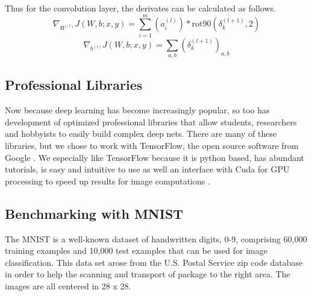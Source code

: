\documentclass[12pt, twocolumn]{article}
\begin{document}
Thus for the convolution layer, the derivates can be calculated as follows.
\begin{equation}
\nabla_{W^{(l)}}J(W,b;x,y) = \sum_{i=1}^m (a^{(l)}_i) \ast \textrm{rot90}( \delta^{(l+1)}_k,2)
\end{equation}
\begin{equation}
\nabla_{b^{(l)}}J(W,b;x,y)= \sum_{a,b}(\delta^{(l+1)}_k)_{a,b}
\end{equation}


\subsection{Professional Libraries}

Now because deep learning has become increasingly popular, so too has development of optimized professional libraries that allow students, researchers and hobbyists to easily build complex deep nets. There are many of these libraries, but we chose to work with TensorFlow, the open source software from Google \cite{TensorFlowGH}. We especially like TensorFlow because it is python based, has abundant tutorials, is easy and intuitive to use as well an interface with Cuda for GPU processing to speed up results for image computations \cite{TensorFlowWeb}. 









\subsection{Benchmarking with MNIST}


The MNIST is a well-known dataset of handwritten digits, 0-9, comprising 60,000 training examples and 10,000 test examples \cite{MNIST}  that can be used for image classification.  This data set arose from the U.S. Postal Service zip code database in order to help the scanning and transport of package to the right area. The images are all centered in 28 x 28.
\end{document}
